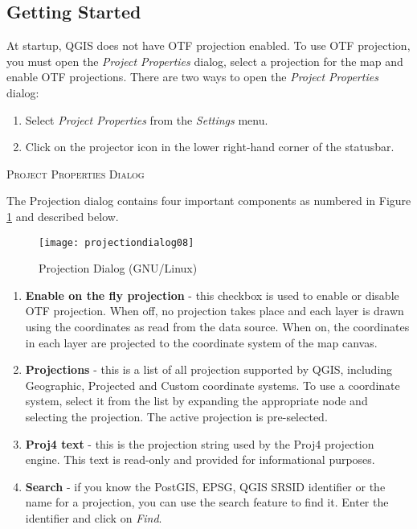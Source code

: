 \subsection{Getting Started}\label{label_projstart}

At startup, QGIS does not have OTF projection enabled. To use OTF
projection, you must open the \textit{Project Properties} dialog, select a
projection for the map and enable OTF projections. There are two ways to open
the \textit{Project Properties} dialog:

\begin{enumerate}
\item Select \textit{Project Properties} from the \textit{Settings} menu.
\item Click on the projector icon in the lower right-hand corner of the
statusbar.
\end{enumerate}

\begin{Tip}
 \caption{\textsc{Project Properties Dialog}}
\end{Tip}

The Projection dialog contains four important components as numbered in Figure
\ref{fig:projections} and described below.

\begin{figure}[ht]
   \begin{center}
   \caption{Projection Dialog (GNU/Linux)}\label{fig:projections}\smallskip
   \texttt{[image: projectiondialog08]}
\end{center}  
\end{figure}

\begin{enumerate}
\item \textbf{Enable on the fly projection} - this checkbox is used
to enable or disable OTF
projection. When off, no projection takes place and each layer
is drawn using the coordinates as read from the data source. When on, the
coordinates in each layer are projected to the coordinate system of the map
canvas.
\item \textbf{Projections} - this is a list of all projection supported by QGIS,
including Geographic, Projected and Custom coordinate systems. To use a
coordinate system, select it from the list by expanding the appropriate node
and selecting the projection. The active projection is pre-selected.
\item \textbf{Proj4 text} - this is the projection string used by the Proj4 projection
engine. This text is read-only and provided for informational purposes.
\item \textbf{Search} - if you know the PostGIS, EPSG, QGIS SRSID identifier or the name 
for a projection, you can use the search feature to find it. Enter the 
identifier and click on \textit{Find}.
\end{enumerate}

